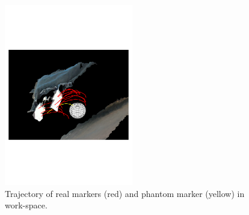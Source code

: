 \documentclass[letterpaper, 10 pt, conference]{ieeeconf}  %
\begin{document}
 \begin{figure}[htpb]
        \centering
        \includegraphics[trim={0 9cm 0 9cm},clip,width=0.5\textwidth]{figures/path/path55.pdf}
        \caption{Trajectory of real markers (red) and phantom marker (yellow) in work-space.}
        \label{fig:work}
\end{figure}
\end{document}
